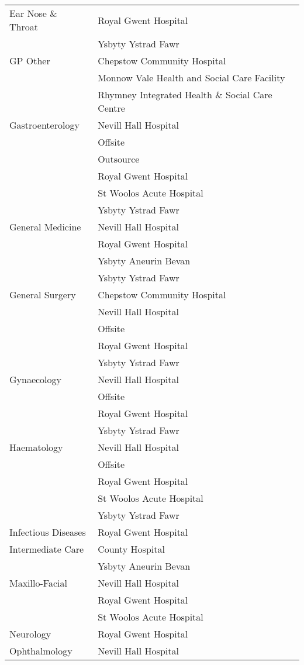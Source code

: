 \documentclass[thesis.tex]{subfiles}
\begin{document}
\begin{flushleft}
\begin{longtable}{ll}
Ear Nose \& Throat&	Royal Gwent Hospital\\
	&Ysbyty Ystrad Fawr\\\hline
GP Other&	Chepstow Community Hospital\\
	&Monnow Vale Health and Social Care Facility\\
	&Rhymney Integrated Health \& Social Care Centre\\\hline
Gastroenterology&	Nevill Hall Hospital\\
	&Offsite\\
	&Outsource\\
	&Royal Gwent Hospital\\
	&St Woolos Acute Hospital\\
	&Ysbyty Ystrad Fawr\\\hline
General Medicine&	Nevill Hall Hospital\\
	&Royal Gwent Hospital\\
	&Ysbyty Aneurin Bevan\\
	&Ysbyty Ystrad Fawr\\\hline 
General Surgery	&Chepstow Community Hospital\\
	&Nevill Hall Hospital\\
	&Offsite\\
	&Royal Gwent Hospital\\ 
	&Ysbyty Ystrad Fawr\\\hline
Gynaecology	&Nevill Hall Hospital\\
	&Offsite\\
	&Royal Gwent Hospital\\
	&Ysbyty Ystrad Fawr\\\hline
Haematology	&Nevill Hall Hospital\\
	&Offsite\\
	&Royal Gwent Hospital\\
	&St Woolos Acute Hospital\\
	&Ysbyty Ystrad Fawr\\\hline
Infectious Diseases&	Royal Gwent Hospital\\\hline
Intermediate Care	&County Hospital\\
	&Ysbyty Aneurin Bevan\\\hline
Maxillo-Facial	&Nevill Hall Hospital\\
	&Royal Gwent Hospital\\
	&St Woolos Acute Hospital\\\hline
Neurology&	Royal Gwent Hospital\\\hline
Ophthalmology&	Nevill Hall Hospital\\

\end{longtable}
\end{flushleft}
\end{document}
